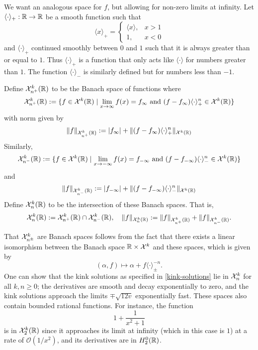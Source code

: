 We want an analogous space for \(f\), but allowing for non-zero limits at infinity. Let \(\langle\cdot \rangle_+ :\mathbb{R} \to \mathbb{R}\) be a smooth function such that
\begin{equation}
	\langle x \rangle_+ = \begin{cases} \langle x \rangle, & x>1 \\ 1, & x<0\end{cases}
\end{equation}
and \(\langle \cdot \rangle_+\) continued smoothly between \(0\) and \(1\) such that it is always greater than or equal to \(1\). Thus \(\langle \cdot \rangle_+\) is a function that only acts like \(\langle \cdot \rangle\) for numbers greater than \(1\). The function \(\langle \cdot \rangle_-\) is similarly defined but for numbers less than \(-1\).

\begin{defn}
	Define \(\mathcal{X}^k_{n^+} (\mathbb{R})\) to be the Banach space of functions where 
	\begin{equation}
		\mathcal{X}^k_{n^+} (\mathbb{R}) := \{ f \in \mathcal{X}^k(\mathbb{R}) \mid \lim_{x\to\infty} f(x) = f_\infty\text{ and } (f-f_\infty)\langle\cdot\rangle_+^n \in \mathcal{X}^k(\mathbb{R})\}
	\end{equation}
	with norm given by
	\begin{equation}
		\| f \|_{\mathcal{X}^k_{n^+}(\mathbb{R})} := |f_\infty| + \|(f-f_\infty) \langle \cdot \rangle_+^n \|_{\mathcal X^k(\mathbb{R})}
	\end{equation}
	Similarly, 
	\begin{equation}
		\mathcal{X}^k_{n^-} (\mathbb{R}) := \{ f \in \mathcal{X}^k(\mathbb{R}) \mid \lim_{x\to-\infty} f(x) = f_{-\infty}\text{ and } (f-f_{-\infty})\langle\cdot\rangle_-^n \in \mathcal{X}^k(\mathbb{R})\}
	\end{equation}
	and 
	\begin{equation}
		\| f \|_{\mathcal{X}^k_{n^-}(\mathbb{R})} := |f_{-\infty}| + \|(f-f_{-\infty}) \langle \cdot \rangle_-^n \|_{\mathcal X^k(\mathbb{R})}
	\end{equation}
	Define \(\mathcal{X}^k_n(\mathbb{R})\) to be the intersection of these Banach spaces. That is,
	\begin{equation}
		\mathcal{X}^k_n(\mathbb{R}) := \mathcal{X}^k_{n^+} (\mathbb{R}) \cap \mathcal{X}^k_{n^-} (\mathbb{R}), \quad \| f \|_{\mathcal{X}^k_{n} (\mathbb{R})} := \|f\|_{\mathcal{X}^k_{n^+} (\mathbb{R})} + \|f\|_{\mathcal{X}^k_{n^-} (\mathbb{R})}.
	\end{equation}
\end{defn}
	That \(\mathcal{X}^k_{n^\pm}\) are Banach spaces follows from the fact that there exists a linear isomorphism between the Banach space \(\mathbb{R}\times \mathcal{X}^k\) and these spaces, which is given by
\begin{equation}
	(\alpha, f) \mapsto \alpha + f \langle \cdot \rangle^{-n}_{\pm}.
\end{equation}
One can show that the kink solutions as specified in \cref{kink-solutions} lie in \(\mathcal{X}^k_n\) for all \(k,n\geq 0\); the derivatives are smooth and decay exponentially to zero, and the kink solutions approach the limits \(\mp\sqrt{12v}\) exponentially fast. These spaces also contain bounded rational functions. For instance, the function \[1 + \frac 1 {x^2 +1}\] is in \(\mathcal{X}^k_2(\mathbb{R})\) since it approaches its limit at infinity (which in this case is \(1\)) at a rate of \(\mathcal O(1/x^2)\), and its derivatives are in \(H^0_2(\mathbb{R})\).

